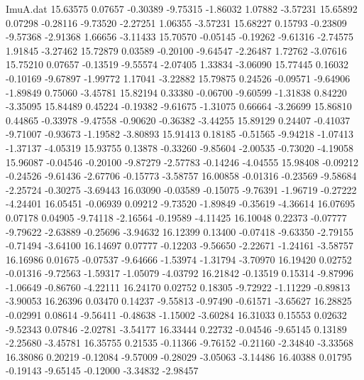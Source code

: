 \begin{filecontents}{ImuA.dat}
  15.63575    0.07657   -0.30389   -9.75315   -1.86032    1.07882   -3.57231
  15.65892    0.07298   -0.28116   -9.73520   -2.27251    1.06355   -3.57231
  15.68227    0.15793   -0.23809   -9.57368   -2.91368    1.66656   -3.11433
  15.70570   -0.05145   -0.19262   -9.61316   -2.74575    1.91845   -3.27462
  15.72879    0.03589   -0.20100   -9.64547   -2.26487    1.72762   -3.07616
  15.75210    0.07657   -0.13519   -9.55574   -2.07405    1.33834   -3.06090
  15.77445    0.16032   -0.10169   -9.67897   -1.99772    1.17041   -3.22882
  15.79875    0.24526   -0.09571   -9.64906   -1.89849    0.75060   -3.45781
  15.82194    0.33380   -0.06700   -9.60599   -1.31838    0.84220   -3.35095
  15.84489    0.45224   -0.19382   -9.61675   -1.31075    0.66664   -3.26699
  15.86810    0.44865   -0.33978   -9.47558   -0.90620   -0.36382   -3.44255
  15.89129    0.24407   -0.41037   -9.71007   -0.93673   -1.19582   -3.80893
  15.91413    0.18185   -0.51565   -9.94218   -1.07413   -1.37137   -4.05319
  15.93755    0.13878   -0.33260   -9.85604   -2.00535   -0.73020   -4.19058
  15.96087   -0.04546   -0.20100   -9.87279   -2.57783   -0.14246   -4.04555
  15.98408   -0.09212   -0.24526   -9.61436   -2.67706   -0.15773   -3.58757
  16.00858   -0.01316   -0.23569   -9.58684   -2.25724   -0.30275   -3.69443
  16.03090   -0.03589   -0.15075   -9.76391   -1.96719   -0.27222   -4.24401
  16.05451   -0.06939    0.09212   -9.73520   -1.89849   -0.35619   -4.36614
  16.07695    0.07178    0.04905   -9.74118   -2.16564   -0.19589   -4.11425
  16.10048    0.22373   -0.07777   -9.79622   -2.63889   -0.25696   -3.94632
  16.12399    0.13400   -0.07418   -9.63350   -2.79155   -0.71494   -3.64100
  16.14697    0.07777   -0.12203   -9.56650   -2.22671   -1.24161   -3.58757
  16.16986    0.01675   -0.07537   -9.64666   -1.53974   -1.31794   -3.70970
  16.19420    0.02752   -0.01316   -9.72563   -1.59317   -1.05079   -4.03792
  16.21842   -0.13519    0.15314   -9.87996   -1.06649   -0.86760   -4.22111
  16.24170    0.02752    0.18305   -9.72922   -1.11229   -0.89813   -3.90053
  16.26396    0.03470    0.14237   -9.55813   -0.97490   -0.61571   -3.65627
  16.28825   -0.02991    0.08614   -9.56411   -0.48638   -1.15002   -3.60284
  16.31033    0.15553    0.02632   -9.52343    0.07846   -2.02781   -3.54177
  16.33444    0.22732   -0.04546   -9.65145    0.13189   -2.25680   -3.45781
  16.35755    0.21535   -0.11366   -9.76152   -0.21160   -2.34840   -3.33568
  16.38086    0.20219   -0.12084   -9.57009   -0.28029   -3.05063   -3.14486
  16.40388    0.01795   -0.19143   -9.65145   -0.12000   -3.34832   -2.98457

\end{filecontents}
